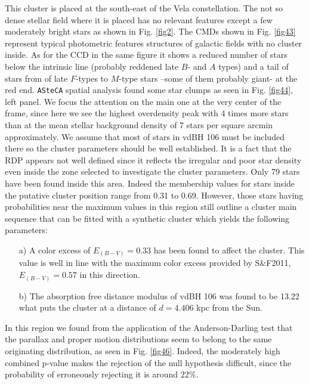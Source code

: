 \documentclass{aa}
\begin{document}
This cluster is placed at the south-east of the Vela constellation. The not so
dense stellar field where it is placed has no relevant features except a few
moderately bright stars as shown in Fig. \ref{fig2}. The CMDs shown in
Fig. \ref{fig43} represent typical photometric features structures of galactic
fields with no cluster inside. As for the CCD in the same figure it shows a
reduced number of stars below the intrinsic line (probably reddened late $B$-
and $A$ types) and a tail of stars from of late $F$-types to $M$-type stars
–some of them probably giant- at the red end.
\texttt{ASteCA} spatial analysis found some star clumps as seen in Fig. 
\ref{fig44}, left panel. We focus the attention on the main one at the very
center of the frame, since here we see the highest overdensity peak with 4 times
more stars than at the mean stellar background density of 7 stars per square
arcmin approximately. We assume that most of stars in vdBH 106
must be included there so the cluster parameters should be well established. It
is a fact that the RDP appears not well defined since it reflects the irregular
and poor star density even inside the zone selected to investigate the cluster
parameters. Only 79 stars have been found inside this area. Indeed the
membership values for stars inside the putative cluster position range from 0.31
to 0.69. However, those stars having probabilities near the maximum values in
this region still outline a cluster main sequence that can be fitted with a
synthetic cluster which yields the following parameters:

\begin{itemize}
\item [a)] A color excess of $E_{(B-V)} = 0.33$ has been found to affect the
    cluster. This value is well in line with the maximum color excess provided
    by S\&F2011, $E_{(B-V)} = 0.57$ in this direction.
\item [b)] The absorption free distance modulus of vdBH 106 was
    found to be 13.22 what puts the cluster at a distance of $d=4.406$ kpc from
    the Sun.
\end{itemize}

In this region we found from the application of the Anderson-Darling test that
the parallax and proper motion distributions seem to belong to the same
originating distribution, as seen in Fig. \ref{fig46}. Indeed, the moderately
high combined p-value makes the rejection of the null hypothesis difficult,
since the probability of erroneously rejecting it is around $22\%$.\\
\end{document}
